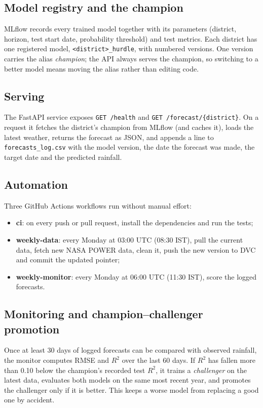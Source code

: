 \subsection{Model registry and the champion}
MLflow \cite{zaharia2018accelerating} records every trained model together with its parameters (district, horizon, test start date, probability threshold) and test metrics. Each district has one registered model, \texttt{<district>\_hurdle}, with numbered versions. One version carries the alias \emph{champion}; the API always serves the champion, so switching to a better model means moving the alias rather than editing code.

\subsection{Serving}
The FastAPI service exposes \texttt{GET /health} and \texttt{GET /forecast/\{district\}}. On a request it fetches the district's champion from MLflow (and caches it), loads the latest weather, returns the forecast as JSON, and appends a line to \texttt{forecasts\_log.csv} with the model version, the date the forecast was made, the target date and the predicted rainfall.

\subsection{Automation}
Three GitHub Actions workflows run without manual effort:
\begin{itemize}
	\item \textbf{ci}: on every push or pull request, install the dependencies and run the tests;
	\item \textbf{weekly-data}: every Monday at 03:00 UTC (08:30 IST), pull the current data, fetch new NASA POWER data, clean it, push the new version to DVC and commit the updated pointer;
	\item \textbf{weekly-monitor}: every Monday at 06:00 UTC (11:30 IST), score the logged forecasts.
\end{itemize}

\subsection{Monitoring and champion--challenger promotion}
Once at least 30 days of logged forecasts can be compared with observed rainfall, the monitor computes RMSE and $R^2$ over the last 60 days. If $R^2$ has fallen more than 0.10 below the champion's recorded test $R^2$, it trains a \emph{challenger} on the latest data, evaluates both models on the same most recent year, and promotes the challenger only if it is better. This keeps a worse model from replacing a good one by accident.

